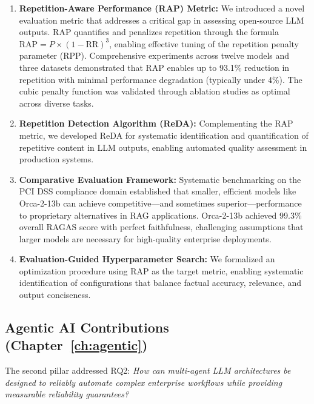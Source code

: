 \begin{enumerate}[leftmargin=*]
    \item \textbf{Repetition-Aware Performance (RAP) Metric:} We introduced a novel evaluation metric that addresses a critical gap in assessing open-source LLM outputs. RAP quantifies and penalizes repetition through the formula $\text{RAP} = P \times (1-\text{RR})^3$, enabling effective tuning of the repetition penalty parameter (RPP). Comprehensive experiments across twelve models and three datasets demonstrated that RAP enables up to 93.1\% reduction in repetition with minimal performance degradation (typically under 4\%). The cubic penalty function was validated through ablation studies as optimal across diverse tasks.
    
    \item \textbf{Repetition Detection Algorithm (ReDA):} Complementing the RAP metric, we developed ReDA for systematic identification and quantification of repetitive content in LLM outputs, enabling automated quality assessment in production systems.
    
    \item \textbf{Comparative Evaluation Framework:} Systematic benchmarking on the PCI DSS compliance domain established that smaller, efficient models like Orca-2-13b can achieve competitive---and sometimes superior---performance to proprietary alternatives in RAG applications. Orca-2-13b achieved 99.3\% overall RAGAS score with perfect faithfulness, challenging assumptions that larger models are necessary for high-quality enterprise deployments.
    
    \item \textbf{Evaluation-Guided Hyperparameter Search:} We formalized an optimization procedure using RAP as the target metric, enabling systematic identification of configurations that balance factual accuracy, relevance, and output conciseness.
\end{enumerate}

\subsection{Agentic AI Contributions (Chapter~\ref{ch:agentic})}

The second pillar addressed RQ2: \textit{How can multi-agent LLM architectures be designed to reliably automate complex enterprise workflows while providing measurable reliability guarantees?}

